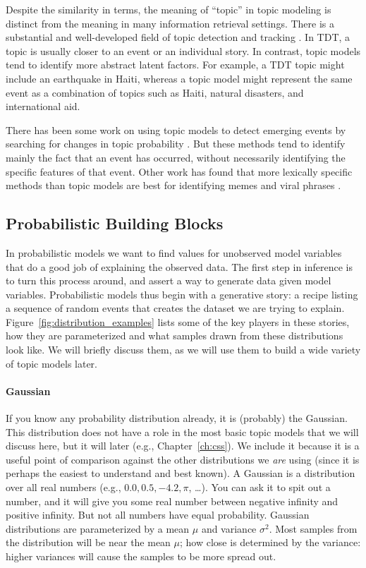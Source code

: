 Despite the similarity in terms, the meaning of ``topic'' in topic modeling is distinct from the meaning in many information retrieval settings.
There is a substantial and well-developed field of topic detection and tracking \cite{allan-02}.
In TDT, a topic is usually closer to an event or an individual story.
In contrast, topic models tend to identify more abstract latent factors.
For example, a TDT topic might include an earthquake in Haiti, whereas a topic model might represent the same event as a combination of topics such as Haiti, natural disasters, and international aid.

There has been some work on using topic models to detect emerging events by searching for changes in topic probability \cite{alsumait-08}.
But these methods tend to identify mainly the fact that an event has occurred, without necessarily identifying the specific features of that event.
Other work has found that more lexically specific methods than topic models are best for identifying memes and viral phrases \cite{leskovec-09}.

\subsection{Probabilistic Building Blocks}
\label{sec:intro_building_blocks}

In probabilistic models we want to find values for unobserved model variables that do a good job of explaining the observed data.
The first step in inference is to turn this process around, and assert a way to generate data given model variables.
Probabilistic models thus begin with a generative story: a recipe listing a sequence of random events
that creates the dataset we are trying to explain.
Figure~\ref{fig:distribution_examples} lists some of the key players in these
stories, how they are parameterized and what samples drawn from these distributions look like.  We will
briefly discuss them, as we will use them to build a wide variety of topic models
later.

\paragraph{Gaussian} If you know any probability distribution already,
it is (probably) the
Gaussian.  This distribution does not have a role in the most basic topic models that we will
discuss here, but it will later (e.g., Chapter~\ref{ch:css}).  We
include it because it is a useful point of comparison against the other
distributions we {\em are} using (since it is perhaps the easiest to understand and best
known). A Gaussian is a distribution over all real numbers (e.g., $0.0, 0.5,
-4.2, \pi$, \dots).  You can ask it to spit out a number, and it will give you
some real number between negative infinity and positive infinity.  But not all
numbers have equal probability.  Gaussian distributions are parameterized by a
mean $\mu$ and variance $\sigma^2$.  Most samples from the distribution will be
near the mean $\mu$; how close is determined by the variance: higher variances
will cause the samples to be more spread out.

